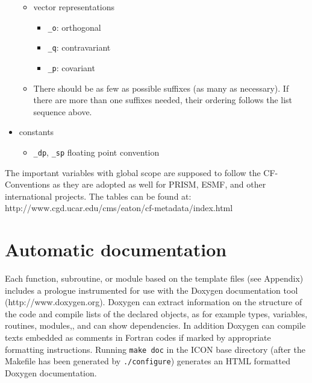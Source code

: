 \documentclass[a4paper,11pt,DIV16,BCOR1cm,titlepage]{scrartcl}
\begin{document}
\begin{itemize}
\begin{itemize}
\item vector representations
\begin{itemize}
\item \texttt{\_o}: orthogonal
\item \texttt{\_q}: contravariant
\item \texttt{\_p}: covariant
\end{itemize}

\item There should be as few as possible suffixes (as many as necessary). If there are 
more than one suffixes needed, their ordering follows the list sequence above.

\end{itemize}

\item constants
\begin{itemize}
\item \texttt{\_dp}, \texttt{\_sp} floating point convention
\end{itemize}

\end{itemize}

The important variables with global scope are supposed to follow the   
CF-Conventions as they are adopted as well for PRISM, ESMF, and other  
international projects. The tables can be found at:  
http://www.cgd.ucar.edu/cms/eaton/cf-metadata/index.html    
     
%
\section{Automatic documentation}  
%
Each function, subroutine, or module based on the template files (see Appendix) includes a 
prologue instrumented for use with the Doxygen documentation tool (http://www.doxygen.org). 
Doxygen can extract information on the structure of the code and compile lists of the declared
objects, as for example types, variables, routines, modules,, and can show dependencies. In 
addition Doxygen can compile texts embedded as comments in Fortran codes if marked by
appropriate formatting instructions.
%
Running \texttt{make doc} in the ICON base directory (after the Makefile has been 
generated by \texttt{./configure}) generates an HTML formatted Doxygen documentation.

%
\end{document}
